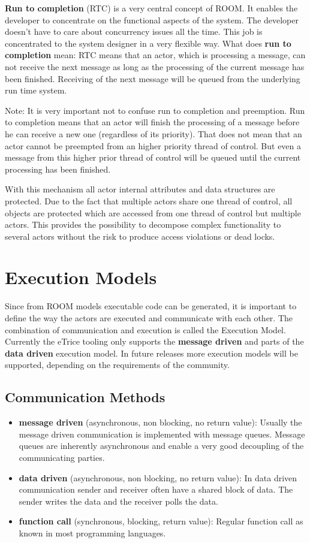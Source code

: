 \textbf{Run to completion} (RTC) is a very central concept of ROOM. It enables the developer to concentrate on the functional aspects of the system. The developer doesn't have to care about concurrency issues all the time. This job is concentrated to the system designer in a very flexible way.
What does \textbf{run to completion} mean:
RTC means that an actor, which is processing a message, can not receive the next message as long as the processing of the current message has been finished. Receiving of the next message will be queued from the underlying run time system.

Note: It is very important not to confuse run to completion and preemption. Run to completion means that an actor will finish the processing of a message before he can receive a new one (regardless of its priority). That does not mean that an actor cannot be preempted from an higher priority thread of control. But even a message from this higher prior thread of control will be queued until the current processing has been finished. 

With this mechanism all actor internal attributes and data structures are protected. Due to the fact that multiple actors share one thread of control, all objects are protected which are accessed from one thread of control but multiple actors. This provides the possibility to decompose complex functionality to several actors without the risk to produce access violations or dead locks.

\section{Execution Models}

Since from ROOM models executable code can be generated, it is important to define the way the actors are executed and communicate with each other. The combination of communication and execution is called the Execution Model.
Currently the eTrice tooling only supports the \textbf{message driven} and parts of the \textbf{data driven} execution model. In future releases more execution models will be supported, depending on the requirements of the community.

\subsection{Communication Methods}

\begin{itemize}
\item \textbf{message driven} (asynchronous, non blocking, no return value): Usually the message driven communication is implemented with message queues. Message queues are inherently asynchronous and enable a very good decoupling of the communicating parties.
\item \textbf{data driven} (asynchronous, non blocking, no return value): In data driven communication sender and receiver often have a shared block of data. The sender writes the data and the receiver polls the data.
\item \textbf{function call} (synchronous, blocking, return value): Regular function call as known in most programming languages.
\end{itemize}

